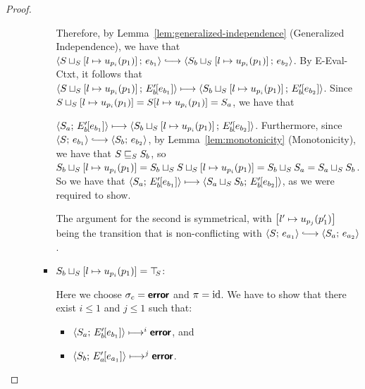 \begin{proof}
\begin{enumerate}
\begin{enumerate}
\begin{itemize}
        Therefore, by Lemma~\ref{lem:generalized-independence}
        (Generalized Independence), we have that
        $\config{\lubstore{S}{\store{\storebindingRaw{l}{u_{p_i}(p_1)}}}}{e_{b_1}}
        \parstepsto
        \config{\lubstore{S_b}{\store{\storebindingRaw{l}{u_{p_i}(p_1)}}}}{e_{b_2}}$.
        By {\sc E-Eval-Ctxt}, it follows that
        $\langle S \sqcup_{S} \left[ l \mapsto u_{p_i}(p_1) \right];\, E'_b\hspace{-1mm}\left[e_{b_1}\right] \rangle
        \longmapsto
        \langle S_b \sqcup_{S} \left[ l \mapsto u_{p_i}(p_1) \right];\, E'_b\hspace{-1mm}\left[e_{b_2}\right] \rangle$.
        Since $S \sqcup_{S} \left[ l \mapsto u_{p_i}(p_1) \right]
        = S[l \mapsto u_{p_i}(p_1)] = S_a$, we have that

        $\langle S_a;\, E'_b\hspace{-1mm}\left[e_{b_1}\right] \rangle \longmapsto
        \langle S_b \sqcup_{S} \left[ l \mapsto u_{p_i}(p_1) \right];\, E'_b\hspace{-1mm}\left[e_{b_2}\right] \rangle$.
        Furthermore, since $\config{S}{e_{b_1}} \parstepsto
        \config{S_b}{e_{b_2}}$, by Lemma~\ref{lem:monotonicity}
        (Monotonicity), we have that $S \sqsubseteq_S S_b$, so
        $S_b \sqcup_{S} \left[ l \mapsto u_{p_i}(p_1) \right]
        =
        S_b \sqcup_{S} S \sqcup_{S} \left[ l \mapsto u_{p_i}(p_1) \right]
        = S_b \sqcup_{S} S_a = S_a \sqcup_{S} S_b$.  So we have that
        $\langle S_a;\, E'_b\hspace{-1mm}\left[e_{b_1}\right] \rangle \longmapsto
        \langle S_a \sqcup_{S} S_b;\, E'_b\hspace{-1mm}\left[e_{b_2}\right] \rangle$, as we
        were required to show.

        The argument for the second is symmetrical, with
        $\left[ l' \mapsto u_{p_j}(p'_1) \right]$ being the
        transition that is non-conflicting with $\config{S}{e_{a_1}}
        \parstepsto \config{S_a}{e_{a_2}}$.

      \item
        $S_b \sqcup_{S} \left[ l \mapsto u_{p_i}(p_1) \right]
        = \top\hspace{-0.85mm}_{S}$:

        Here we choose $\sigma_c = \textbf{\textsf{error}}$ and $\pi = \mathrm{id}$.  We have to
        show that there exist $i \leq 1$ and $j \leq 1$ such that:
        \begin{itemize}
        \item $\langle S_a;\, E'_b\hspace{-1mm}\left[e_{b_1}\right] \rangle \longmapsto^i
          \textbf{\textsf{error}}$, and
        \item
          $\langle S_b;\, E'_a\hspace{-1mm}\left[e_{a_1}\right] \rangle \longmapsto^j \textbf{\textsf{error}}$.
        \end{itemize}


\end{itemize}
\end{enumerate}
\end{enumerate}
\end{proof}
